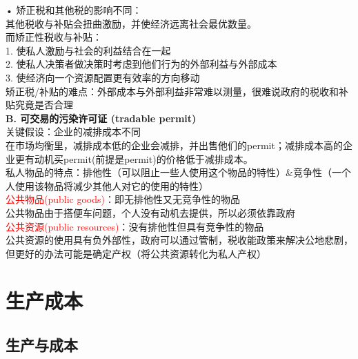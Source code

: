 \documentclass[12pt,a4paper]{article}
\begin{document}
\noindent • 矫正税和其他税的影响不同：\\

其他税收与补贴会扭曲激励，并使经济远离社会最优数量。\\

而矫正性税收与补贴：\\
1. 使私人激励与社会的利益结合在一起\\
2. 使私人决策者做决策时考虑到他们行为的外部利益与外部成本\\
3. 使经济向一个资源配置更有效率的方向移动\\

矫正税/补贴的难点：外部成本与外部利益非常难以测量，很难说政府的税收和补贴究竟是否合理\\

\textbf{B. 可交易的污染许可证 (tradable permit) }\\

\noindent 关键假设：企业的减排成本不同\\

在市场均衡里，减排成本低的企业会减排，并出售他们的permit；减排成本高的企业更有动机买permit(前提是permit)的价格低于减排成本。\\


私人物品的特点：排他性（可以阻止一些人使用这个物品的特性）\&竞争性（一个人使用该物品将减少其他人对它的使用的特性）\\

\textcolor{red}{公共物品(public goods)}：即无排他性又无竞争性的物品\\

公共物品由于搭便车问题，个人没有动机去提供，所以必须依靠政府\\

\textcolor{red}{公共资源(public resources)}：没有排他性但具有竞争性的物品\\

公共资源的使用具有负外部性，政府可以通过管制，税收能政策来解决公地悲剧，但更好的办法可能是确定产权（将公共资源转化为私人产权）

\newpage
\section{生产成本}

\subsection{生产与成本}
\end{document}
